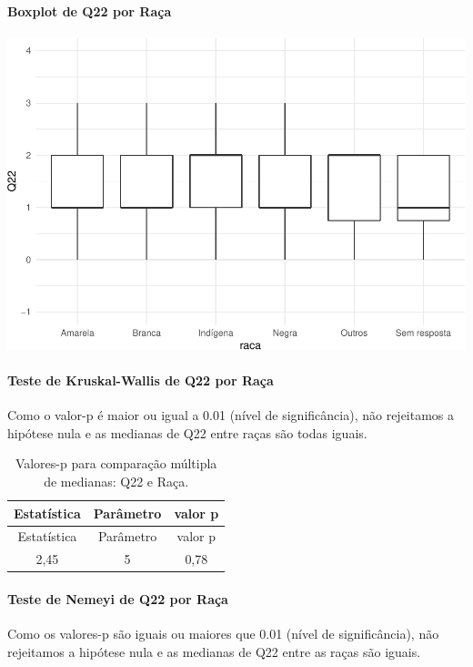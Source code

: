 \documentclass[]{article}
\let\oldparagraph\paragraph
\renewcommand{\paragraph}[1]{\oldparagraph{#1}\mbox{}}
\begin{document}
\hypertarget{boxplot-de-q22-por-rauxe7a}{%
\paragraph{Boxplot de Q22 por Raça}\label{boxplot-de-q22-por-rauxe7a}}

\begin{center}\includegraphics[width=0.75\linewidth]{relatorio_covid19_files/figure-latex/unnamed-chunk-519-1} \end{center}

\hypertarget{teste-de-kruskal-wallis-de-q22-por-rauxe7a}{%
\paragraph{Teste de Kruskal-Wallis de Q22 por Raça}\label{teste-de-kruskal-wallis-de-q22-por-rauxe7a}}

Como o valor-p é maior ou igual a 0.01 (nível de significância), não rejeitamos a hipótese nula e as medianas de Q22 entre raças são todas iguais.

\begin{longtable}[]{@{}ccc@{}}
\caption{\label{tab:unnamed-chunk-521}Valores-p para comparação múltipla de medianas: Q22 e Raça.}\tabularnewline
\toprule
Estatística & Parâmetro & valor p\tabularnewline
\midrule
\endfirsthead
\toprule
Estatística & Parâmetro & valor p\tabularnewline
\midrule
\endhead
2,45 & 5 & 0,78\tabularnewline
\bottomrule
\end{longtable}

\hypertarget{teste-de-nemeyi-de-q22-por-rauxe7a}{%
\paragraph{Teste de Nemeyi de Q22 por Raça}\label{teste-de-nemeyi-de-q22-por-rauxe7a}}

Como os valores-p são iguais ou maiores que 0.01 (nível de significância), não rejeitamos a hipótese nula e as medianas de Q22 entre as raças são iguais.
\end{document}
